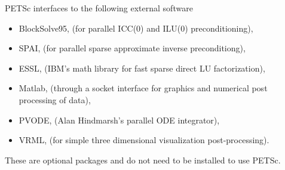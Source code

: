 \vspace{.3in}
PETSc interfaces to the following external software
\begin{itemize}
  \item BlockSolve95, (for parallel ICC(0) and ILU(0) preconditioning),
  \item SPAI,         (for parallel sparse approximate inverse preconditiong),
  \item ESSL,         (IBM's math library for fast sparse direct LU factorization),
  \item Matlab,       (through a socket interface for graphics and numerical post processing 
                       of data),
  \item PVODE,        (Alan Hindmarsh's parallel ODE integrator),
  \item VRML,         (for simple three dimensional visualization post-processing).
\end{itemize}
These are optional packages and do not need to be installed to use PETSc.


